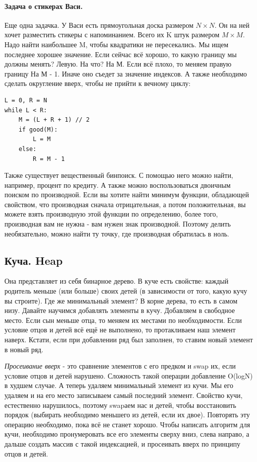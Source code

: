 \documentclass[12pt]{article}
\begin{document}
\paragraph{Задача о стикерах Васи.}
Еще одна задачка. У Васи есть прямоугольная доска размером $N\times N$. Он на ней хочет разместить стикеры с напоминанием. Всего их K штук размером $M\times M$. Надо найти наибольшее M, чтобы квадратики не пересекались. Мы ищем последнее хорошее значение. Если сейчас всё хорошо, то какую границу мы должны менять? Левую. На что? На М. Если всё плохо, то меняем правую границу На М - 1. Иначе оно съедет за значение индексов. А также необходимо сделать округление вверх, чтобы не прийти к вечному циклу:
\begin{verbatim}
L = 0, R = N
while L < R:
    M = (L + R + 1) // 2
    if good(M):
        L = M
    else:
        R = M - 1
\end{verbatim}
Также существует вещественный бинпоиск. С помощью него можно найти, например, процент по кредиту. А также можно воспользоваться двоичным поиском по производной. Если вы хотите найти минимум функции, обладающей свойством, что производная сначала отрицательная, а потом положительная, вы можете взять производную этой функции по определению, более того, производная вам не нужна - вам нужен знак производной. Поэтому делить необязательно, можно найти ту точку, где производная обратилась в ноль. 
\subsection*{Куча. Heap}
Она представляет из себя бинарное дерево. В куче есть свойстве: каждый родитель меньше (или больше) своих детей (в зависимости от того, какую кучу вы строите). Где же минимальный элемент? В корне дерева, то есть в самом низу. Давайте научимся добавлять элементы в кучу. Добавляем в свободное место. Если сын меньше отца, то меняем их местами по необходимости. Если условие отцов и детей всё ещё не выполнено, то протакливаем наш элемент наверх. Кстати, если при добавлении ряд был заполнен, то ставим новый элемент в новый ряд.

\textit{Просеивание вверх} - это сравнение элементов с его предком и swap их, если условие отцов и детей нарушено. Сложность такой операции добавление O(logN) в худшем случае. А теперь удаляем минимальный элемент из кучи. Мы его удаляем и на его место записываем самый последний элемент. Свойство кучи, естественно нарушилось, поэтому swapаем нас и детей, чтобы восстановить порядок (выбирать необходимо меньшего из детей, если их двое). Повторять эту операцию необходимо, пока всё не станет хорошо. Чтобы написать алгоритм для кучи, необходимо пронумеровать все его элементы сверху вниз, слева направо, а дальше создать массив с такой индексацией, и просеивать вверх по принципу отцов и детей.
\end{document}
